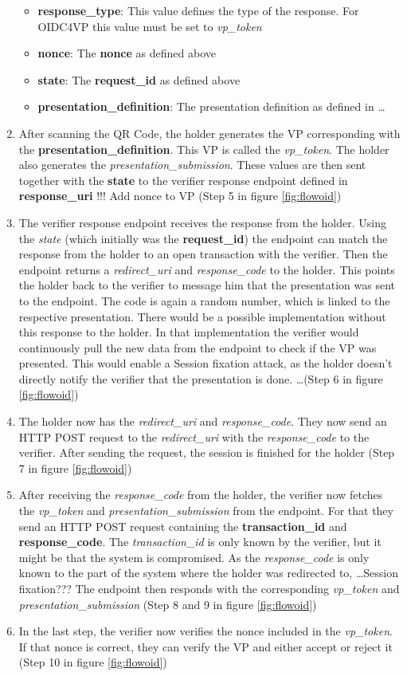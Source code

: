 \documentclass[
	a4paper               %
	,bibliography=totoc   %
	,listof=totoc         %
	,monolingual
]{bfhthesis}              %
\begin{document}
\begin{enumerate}
\begin{itemize}
		\item \textbf{response\_type}: This value defines the type of the response. For OIDC4VP this value must be set to \textit{vp\_token}
		\item \textbf{nonce}: The \textbf{nonce} as defined above
		\item \textbf{state}: The \textbf{request\_id} as defined above
		\item \textbf{presentation\_definition}: The presentation definition as defined in \dots
	\end{itemize}
	\item After scanning the QR Code, the holder generates the VP corresponding with the \textbf{presentation\_definition}. This VP is called the \textit{vp\_token}. The holder also generates the \textit{presentation\_submission}. These values are then sent together with the \textbf{state} to the verifier response endpoint defined in \textbf{response\_uri} !!! Add nonce to VP (Step 5 in figure \ref{fig:flowoid})
	\item The verifier response endpoint receives the response from the holder. Using the \textit{state} (which initially was the \textbf{request\_id}) the endpoint can match the response from the holder to an open transaction with the verifier. Then the endpoint returns a \textit{redirect\_uri} and \textit{response\_code} to the holder. This points the holder back to the verifier to message him that the presentation was sent to the endpoint. The code is again a random number, which is linked to the respective presentation. There would be a possible implementation without this response to the holder. In that implementation the verifier would continuously pull the new data from the endpoint to check if the VP was presented. This would enable a Session fixation attack, as the holder doesn't directly notify the verifier that the presentation is done. \dots (Step 6 in figure \ref{fig:flowoid})
	\item The holder now has the \textit{redirect\_uri} and \textit{response\_code}. They now send an HTTP POST request to the \textit{redirect\_uri} with the \textit{response\_code} to the verifier. After sending the request, the session is finished for the holder (Step 7 in figure \ref{fig:flowoid})
	\item After receiving the \textit{response\_code} from the holder, the verifier now fetches the \textit{vp\_token} and \textit{presentation\_submission} from the endpoint. For that they send an HTTP POST request containing the \textbf{transaction\_id} and \textbf{response\_code}. The \textit{transaction\_id} is only known by the verifier, but it might be that the system is compromised. As the \textit{response\_code} is only known to the part of the system where the holder was redirected to, \dots Session fixation??? The endpoint then responds with the corresponding \textit{vp\_token} and \textit{presentation\_submission} (Step 8 and 9 in figure \ref{fig:flowoid})
	\item In the last step, the verifier now verifies the nonce included in the \textit{vp\_token}. If that nonce is correct, they can verify the VP and either accept or reject it (Step 10 in figure \ref{fig:flowoid})
\end{enumerate}
\end{document}
